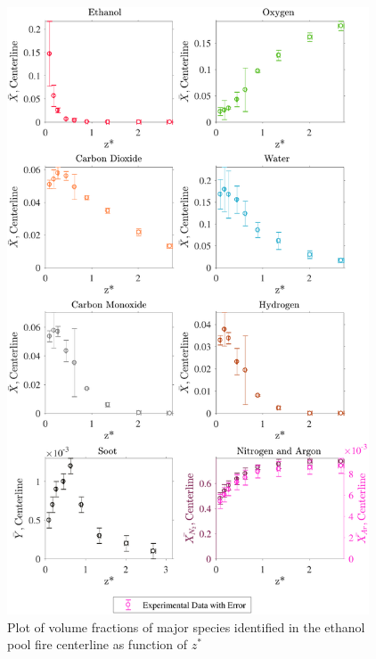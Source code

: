 \documentclass[12pt]{article}
\begin{document}
\begin{figure}[!h]
	\centering
\includegraphics[width=10.75cm,keepaspectratio]{Ethanol_MOL_FRAC_Plot.pdf}
	\caption[Volume fractions of major species in the ethanol plume]{Plot of volume fractions of major species identified in the ethanol pool fire centerline as function of $z^{*}$}
	\label{fig:Ethanol_VOL_Frac_Major}
\end{figure}
\pagebreak
\end{document}
